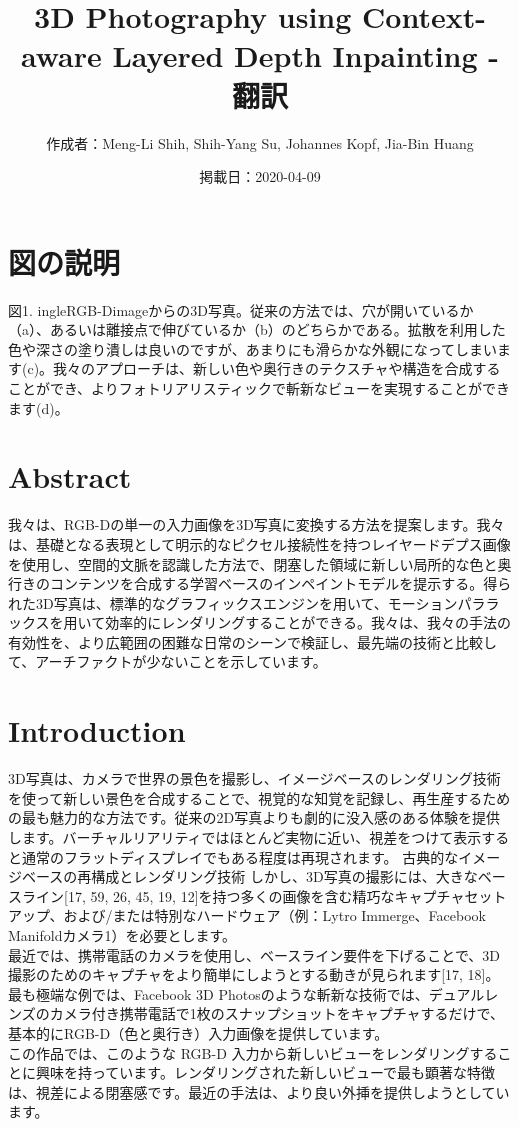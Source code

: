 \documentclass[a4paper,10pt,titlepage]{jsarticle}
\title{3D Photography using Context-aware Layered Depth Inpainting -翻訳
}
\date{掲載日：2020-04-09}
\author{作成者：Meng-Li Shih, Shih-Yang Su, Johannes Kopf, Jia-Bin Huang}
\begin{document}
\maketitle

\section{図の説明}
図1. ingleRGB-Dimageからの3D写真。従来の方法では、穴が開いているか（a）、あるいは離接点で伸びているか（b）のどちらかである。拡散を利用した色や深さの塗り潰しは良いのですが、あまりにも滑らかな外観になってしまいます(c)。我々のアプローチは、新しい色や奥行きのテクスチャや構造を合成することができ、よりフォトリアリスティックで斬新なビューを実現することができます(d)。

\section{Abstract}
我々は、RGB-Dの単一の入力画像を3D写真に変換する方法を提案します。我々は、基礎となる表現として明示的なピクセル接続性を持つレイヤードデプス画像を使用し、空間的文脈を認識した方法で、閉塞した領域に新しい局所的な色と奥行きのコンテンツを合成する学習ベースのインペイントモデルを提示する。得られた3D写真は、標準的なグラフィックスエンジンを用いて、モーションパララックスを用いて効率的にレンダリングすることができる。我々は、我々の手法の有効性を、より広範囲の困難な日常のシーンで検証し、最先端の技術と比較して、アーチファクトが少ないことを示しています。

\section{Introduction}
3D写真は、カメラで世界の景色を撮影し、イメージベースのレンダリング技術を使って新しい景色を合成することで、視覚的な知覚を記録し、再生産するための最も魅力的な方法です。従来の2D写真よりも劇的に没入感のある体験を提供します。バーチャルリアリティではほとんど実物に近い、視差をつけて表示すると通常のフラットディスプレイでもある程度は再現されます。
古典的なイメージベースの再構成とレンダリング技術 しかし、3D写真の撮影には、大きなベースライン[17, 59, 26, 45, 19, 12]を持つ多くの画像を含む精巧なキャプチャセットアップ、および/または特別なハードウェア（例：Lytro Immerge、Facebook Manifoldカメラ1）を必要とします。\\

最近では、携帯電話のカメラを使用し、ベースライン要件を下げることで、3D撮影のためのキャプチャをより簡単にしようとする動きが見られます[17, 18]。
 最も極端な例では、Facebook 3D Photosのような斬新な技術では、デュアルレンズのカメラ付き携帯電話で1枚のスナップショットをキャプチャするだけで、基本的にRGB-D（色と奥行き）入力画像を提供しています。\\
 この作品では、このような RGB-D 入力から新しいビューをレンダリングすることに興味を持っています。レンダリングされた新しいビューで最も顕著な特徴は、視差による閉塞感です。最近の手法は、より良い外挿を提供しようとしています。\\
\end{document}
